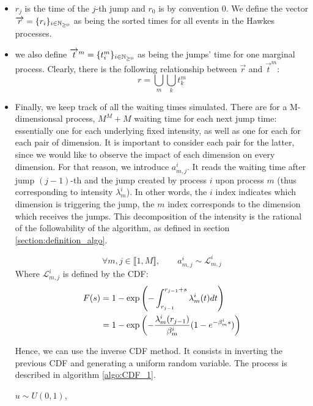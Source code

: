 \documentclass[11pt]{book}
\newcommand{\sequence}[1]{\{ #1 \}_{ i \in \N} }
\begin{document}
\begin{itemize}
\item $r_j$ is the time of the $j$-th jump and $r_0$ is by convention $0$. We define the vector $\overrightarrow{r} = \sequence{r_i}$ as being the sorted times for all events in the Hawkes processes. 
\item we also define $\overrightarrow{t}^m = \sequence{ t_i^m } $ as being the jumps' time for one marginal process. Clearly, there is the following relationship between $\overrightarrow{r}$ and $\overrightarrow{t}^m $:
$$ r = \bigcup_m \bigcup_k  t_k^m $$
\item Finally, we keep track of all the waiting times simulated. There are for a M-dimensionsal process, $M^M + M$ waiting time for each next jump time: essentially one for each underlying fixed intensity, as well as one for each for each pair of dimension. It is important to consider each pair for the latter, since we would like to observe the impact of each dimension on every dimension. For that reason, we introduce $a_{m,j}^i$. It reads the waiting time after jump $(j-1)$-th and the jump created by process $i$ upon process $m$ (thus corresponding to intensity $ \lambda^i_m$). In other words, the $i$ index indicates which dimension is triggering the jump, the $m$ index corresponds to the dimension which receives the jumps. This decomposition of the intensity is the rational of the followability of the algorithm, as defined in section \ref{section:definition_algo}.


\begin{remarque}
$$\forall m,j \in  \llbracket 1, M \rrbracket, \qquad a_{m,j}^i \sim \mathcal L_{m,j}^i   $$
Where $\mathcal L_{m,j}^i $ is defined by the CDF:
\begin{align}
F(s) &= 1 - \exp \left ( - \int_{r_{j-1}}^{r_{j-1} + s } \lambda_m^i (t) dt \right ) \notag \\
&= 1 - \exp \left ( - \frac { \lambda^i_m ( r_{j-1} ) } { \beta_m^i } ( 1 - e^{ - \beta_m^i s} ) \right )
\label{eq:L_defined}
\end{align}

Hence, we can use the inverse CDF method. It consists in inverting the previous CDF and generating a uniform random variable. The process is described in algorithm \ref{algo:CDF_1}.
\end{remarque}



\begin{algorithm}[H]
\label{algo:CDF_1}
\SetAlgoLined
$u \sim U(0,1)$,


\end{algorithm}
\end{itemize}
\end{document}
